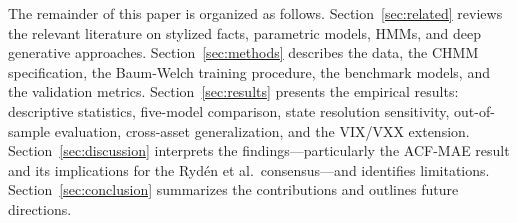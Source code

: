 The remainder of this paper is organized as follows.
Section~\ref{sec:related} reviews the relevant literature on stylized facts, parametric models, HMMs, and deep generative approaches.
Section~\ref{sec:methods} describes the data, the CHMM specification, the Baum-Welch training procedure, the benchmark models, and the validation metrics.
Section~\ref{sec:results} presents the empirical results: descriptive statistics, five-model comparison, state resolution sensitivity, out-of-sample evaluation, cross-asset generalization, and the VIX/VXX extension.
Section~\ref{sec:discussion} interprets the findings---particularly the ACF-MAE result and its implications for the Ryd\'{e}n et al.\ consensus---and identifies limitations.
Section~\ref{sec:conclusion} summarizes the contributions and outlines future directions.
